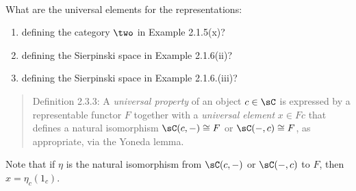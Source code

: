 \documentclass[main.tex]{subfiles}
\begin{document}
\paragraph{}
\begin{exercise}
What are the universal elements for the representations:
\begin{enumerate}
\item defining the category $\two$ in Example 2.1.5(x)?
\item defining the Sierpinski space in Example 2.1.6(ii)?
\item defining the Sierpinski space in Example 2.1.6.(iii)?
\end{enumerate}
\end{exercise}

\begin{quote}
Definition 2.3.3: A \emph{universal property} of an object $c\in\sC$ is 
expressed by a representable functor $F$ together with a \emph{universal 
element} $x\in Fc$ that defines a natural isomorphism $\sC(c,-)\cong F$ or 
$\sC(-,c)\cong F$, as appropriate, via the Yoneda lemma.
\end{quote}

Note that if $\eta$ is the natural isomorphism from $\sC(c,-)$ or $\sC(-,c)$ to 
$F$, then $x=\eta_c(1_c)$.
\end{document}
